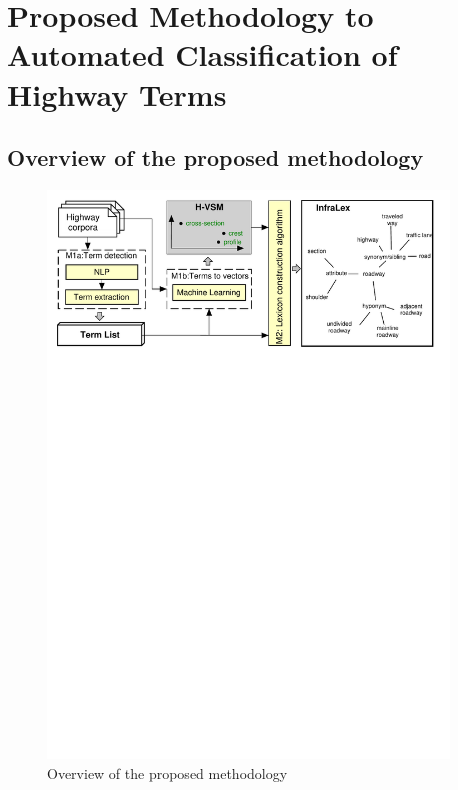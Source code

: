 \documentclass[Journal,InsideFigs, DoubleSpace]{ascelike} %
\begin{document}
\section{Proposed Methodology to Automated Classification of Highway Terms} \label{sec:RoadLex}
\subsection{Overview of the proposed methodology} \label{sec:proposed_method} %
\begin{figure}[t]
	\centering
	\includegraphics[width=0.95\textwidth]{Figure1_overview_methodology}
	\caption{Overview of the proposed methodology}
	\label{fig:framework}
\end{figure}
%
\end{document}
